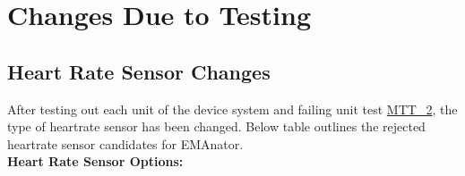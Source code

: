 \documentclass[12pt, titlepage]{article}
\begin{document}
\section{Changes Due to Testing}

\subsection{Heart Rate Sensor Changes}\label{hr_changes}
After testing out each unit of the device system and failing unit test \hyperref[MTT2]{MTT\_2}, the type of heartrate sensor has been changed. Below table outlines the rejected heartrate sensor candidates for EMAnator.\\


\textbf{Heart Rate Sensor Options:}

\begin{table}[H]


\end{table}
\end{document}
